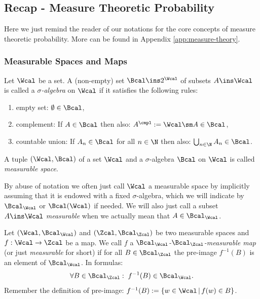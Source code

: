 \subsection{Recap - Measure Theoretic Probability}

Here we just remind the reader of our notations for the core concepts of measure theoretic probability. More can be found 
in Appendix \ref{app:measure-theory}.

\subsubsection{Measurable Spaces and Maps}

\begin{Def}
    \label{def:sigma-algebra}
    Let $\Wcal$ be a set. A (non-empty) set $\Bcal \ins 2^\Wcal$ of subsets $A \ins \Wcal$ is called a 
    \emph{$\sigma$-algebra} on $\Wcal$ if it satisfies the following rules:
    \begin{enumerate}[label=\roman*)]
        \item empty set: $\emptyset \in \Bcal$,
        \item complement: If $A \in \Bcal$ then also: $A^\cmpl:= \Wcal\sm A \in \Bcal$,
        \item countable union: If $A_n \in \Bcal$ for all $n \in \N$ then also: $\bigcup_{n \in \N} A_n \in \Bcal$.
    \end{enumerate}
\end{Def}

\begin{Def}
    \label{def:measurable-space}
    A tuple $(\Wcal,\Bcal)$ of a set $\Wcal$ and a $\sigma$-algebra $\Bcal$ on $\Wcal$ is called \emph{measurable space}.
\end{Def}

\begin{Rem}
 By abuse of notation we often just call $\Wcal$ a measurable space by implicitly assuming that it is endowed with a fixed $\sigma$-algebra, which we will indicate by $\Bcal_\Wcal$ or $\Bcal(\Wcal)$ if needed. We will also just call a subset $A \ins \Wcal$ \emph{measurable} when we actually mean that $A \in \Bcal_\Wcal$.
\end{Rem}

\begin{Def}
    \label{def-measurable-map}
    Let $(\Wcal,\Bcal_\Wcal)$ and $(\Zcal,\Bcal_\Zcal)$ be two measurable spaces and $f: \Wcal \to \Zcal$ be a map.
    We call $f$ a \emph{$\Bcal_\Wcal$-$\Bcal_\Zcal$-measurable map} (or just \emph{measurable} for short) if
    for all $B \in \Bcal_\Zcal$ the pre-image $f^{-1}(B)$ is an element of $\Bcal_\Wcal$. In formulas:
    \[\forall B \in \Bcal_\Zcal:\; f^{-1}(B) \in \Bcal_\Wcal.\]
    Remember the definition of pre-image: $f^{-1}(B) := \{ w\in \Wcal\,|\, f(w) \in B \}$.
\end{Def}

